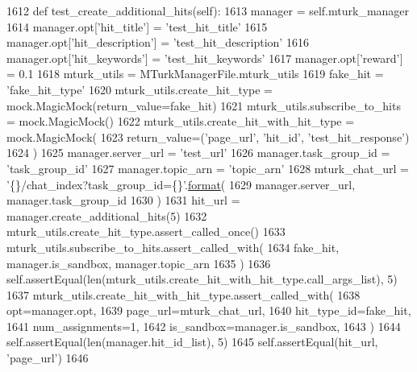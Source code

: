 \begin{DoxyCode}
1612     \textcolor{keyword}{def }test\_create\_additional\_hits(self):
1613         manager = self.mturk\_manager
1614         manager.opt[\textcolor{stringliteral}{'hit\_title'}] = \textcolor{stringliteral}{'test\_hit\_title'}
1615         manager.opt[\textcolor{stringliteral}{'hit\_description'}] = \textcolor{stringliteral}{'test\_hit\_description'}
1616         manager.opt[\textcolor{stringliteral}{'hit\_keywords'}] = \textcolor{stringliteral}{'test\_hit\_keywords'}
1617         manager.opt[\textcolor{stringliteral}{'reward'}] = 0.1
1618         mturk\_utils = MTurkManagerFile.mturk\_utils
1619         fake\_hit = \textcolor{stringliteral}{'fake\_hit\_type'}
1620         mturk\_utils.create\_hit\_type = mock.MagicMock(return\_value=fake\_hit)
1621         mturk\_utils.subscribe\_to\_hits = mock.MagicMock()
1622         mturk\_utils.create\_hit\_with\_hit\_type = mock.MagicMock(
1623             return\_value=(\textcolor{stringliteral}{'page\_url'}, \textcolor{stringliteral}{'hit\_id'}, \textcolor{stringliteral}{'test\_hit\_response'})
1624         )
1625         manager.server\_url = \textcolor{stringliteral}{'test\_url'}
1626         manager.task\_group\_id = \textcolor{stringliteral}{'task\_group\_id'}
1627         manager.topic\_arn = \textcolor{stringliteral}{'topic\_arn'}
1628         mturk\_chat\_url = \textcolor{stringliteral}{'\{\}/chat\_index?task\_group\_id=\{\}'}.\hyperlink{namespaceparlai_1_1chat__service_1_1services_1_1messenger_1_1shared__utils_a32e2e2022b824fbaf80c747160b52a76}{format}(
1629             manager.server\_url, manager.task\_group\_id
1630         )
1631         hit\_url = manager.create\_additional\_hits(5)
1632         mturk\_utils.create\_hit\_type.assert\_called\_once()
1633         mturk\_utils.subscribe\_to\_hits.assert\_called\_with(
1634             fake\_hit, manager.is\_sandbox, manager.topic\_arn
1635         )
1636         self.assertEqual(len(mturk\_utils.create\_hit\_with\_hit\_type.call\_args\_list), 5)
1637         mturk\_utils.create\_hit\_with\_hit\_type.assert\_called\_with(
1638             opt=manager.opt,
1639             page\_url=mturk\_chat\_url,
1640             hit\_type\_id=fake\_hit,
1641             num\_assignments=1,
1642             is\_sandbox=manager.is\_sandbox,
1643         )
1644         self.assertEqual(len(manager.hit\_id\_list), 5)
1645         self.assertEqual(hit\_url, \textcolor{stringliteral}{'page\_url'})
1646 
\end{DoxyCode}
\mbox{\label{classparlai_1_1mturk_1_1core_1_1test_1_1test__mturk__manager_1_1TestMTurkManagerConnectedFunctions_a9b18b72e9d38a4c4efb0990f9cb7ce22}} 
